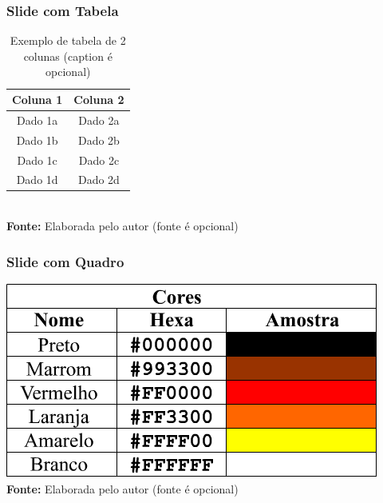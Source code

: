 \begin{frame}

    \frametitle{Slide com Tabela}
    
    \begin{table}[!htbp]
       	\centering
       	\caption{Exemplo de tabela de 2 colunas (caption é opcional)}
       	\begin{tabular}{ c | c }
       		\hline
       		\textbf{Coluna 1} & \textbf{Coluna 2} \\ \hline
       		Dado 1a           & Dado 2a           \\ \hline
       		Dado 1b           & Dado 2b           \\ \hline
       		Dado 1c           & Dado 2c           \\ \hline
       		Dado 1d           & Dado 2d           \\ \hline
       	\end{tabular}
       	\\ \vspace{0.2cm}
       	\small{\textbf{Fonte:} Elaborada pelo autor (fonte é opcional)}%
     \end{table}
         
\end{frame}


\begin{frame}

    \frametitle{Slide com Quadro}
    
    \begin{quadro}[!htbp]
       	\centering
       	\caption{Exemplo de quadro (caption é opcional)}
       	\includegraphics[scale=.3]{imagens/exemploQuadro}
        \\ \vspace{0.2cm}
       	\small{\textbf{Fonte:} Elaborada pelo autor (fonte é opcional)}%
    \end{quadro}
         
\end{frame}


